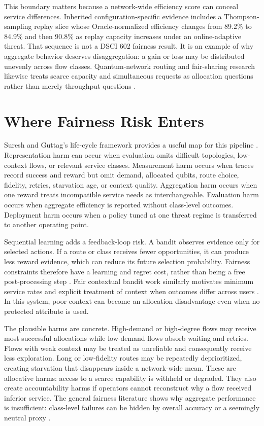 \documentclass[10pt,conference]{IEEEtran}
\begin{document}
This boundary matters because a network-wide efficiency score can conceal
service differences. Inherited configuration-specific evidence includes a
Thompson-sampling replay slice whose Oracle-normalized efficiency changes from
89.2\% to 84.9\% and then 90.8\% as replay capacity increases under an
online-adaptive threat. That sequence is not a DSCI 602 fairness result. It is
an example of why aggregate behavior deserves disaggregation: a gain or loss
may be distributed unevenly across flow classes. Quantum-network routing and
fair-sharing research likewise treats scarce capacity and simultaneous
requests as allocation questions rather than merely throughput questions
\cite{li2021,cicconetti2023}.

\section{Where Fairness Risk Enters}
Suresh and Guttag's life-cycle framework provides a useful map for this
pipeline \cite{suresh2021}. Representation harm can occur when evaluation
omits difficult topologies, low-context flows, or relevant service classes.
Measurement harm occurs when traces record success and reward but omit demand,
allocated qubits, route choice, fidelity, retries, starvation age, or context
quality. Aggregation harm occurs when one reward treats incompatible service
needs as interchangeable. Evaluation harm occurs when aggregate efficiency is
reported without class-level outcomes. Deployment harm occurs when a policy
tuned at one threat regime is transferred to another operating point.

Sequential learning adds a feedback-loop risk. A bandit observes evidence only
for selected actions. If a route or class receives fewer opportunities, it can
produce less reward evidence, which can reduce its future selection probability.
Fairness constraints therefore have a learning and regret cost, rather than
being a free post-processing step \cite{joseph2016}. Fair contextual bandit
work similarly motivates minimum service rates and explicit treatment of
context when outcomes differ across users \cite{chen2020}. In this system,
poor context can become an allocation disadvantage even when no protected
attribute is used.

The plausible harms are concrete. High-demand or high-degree flows may receive
most successful allocations while low-demand flows absorb waiting and retries.
Flows with weak context may be treated as unreliable and consequently receive
less exploration. Long or low-fidelity routes may be repeatedly deprioritized,
creating starvation that disappears inside a network-wide mean. These are
allocative harms: access to a scarce capability is withheld or degraded. They
also create accountability harms if operators cannot reconstruct why a flow
received inferior service. The general fairness literature shows why aggregate
performance is insufficient: class-level failures can be hidden by overall
accuracy or a seemingly neutral proxy \cite{buolamwini2018,obermeyer2019}.
\end{document}
